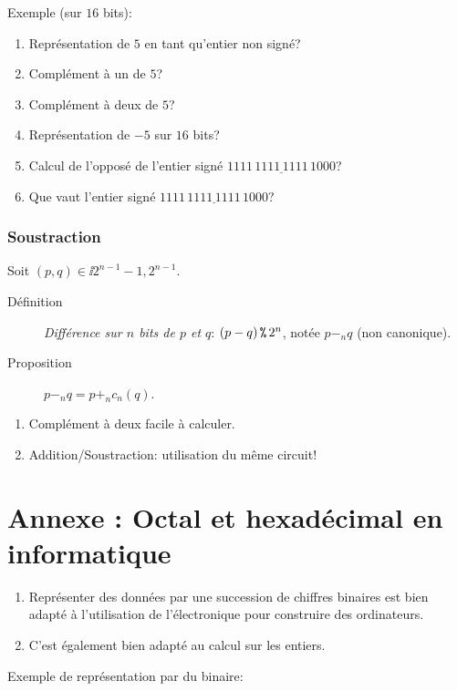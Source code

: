 Exemple (sur $16$ bits):
\begin{enumerate}
\item Représentation  de $5$ en tant qu'entier non signé?
\item Complément à un de $5$?
\item Complément à deux de $5$?
\item Représentation de $-5$ sur $16$ bits?
\item Calcul de l'opposé de l'entier signé $\underline{1111\,1111\,1111\,1000}$?
\item Que vaut l'entier signé $\underline{1111\,1111\,1111\,1000}$?
\end{enumerate}

\subsubsection{Soustraction}

Soit $(p,q)\in\ii{2^{n-1}-1,2^{n-1}}$.
\begin{description}
\item[Définition] \emph{Différence sur $n$ bits de $p$ et $q$}: $(p-
  q)\operatorname{\texttt{\%}} 2^{n}$, notée $p-_{n}q$ (non canonique).
\item[Proposition] $p -_{n} q = p +_{n} c_{n}(q)$.
\end{description}

\begin{enumerate}
\item Complément à deux facile à calculer.
\item Addition/Soustraction: utilisation du même circuit!
\end{enumerate}


\section{Annexe : Octal et hexadécimal en informatique}

\begin{enumerate}
\item Représenter des données par une succession de chiffres binaires
  est bien adapté à l'utilisation de l'électronique pour construire des
  ordinateurs.
\item C'est également bien adapté au calcul sur les entiers.
\end{enumerate}

Exemple de représentation par du binaire:


